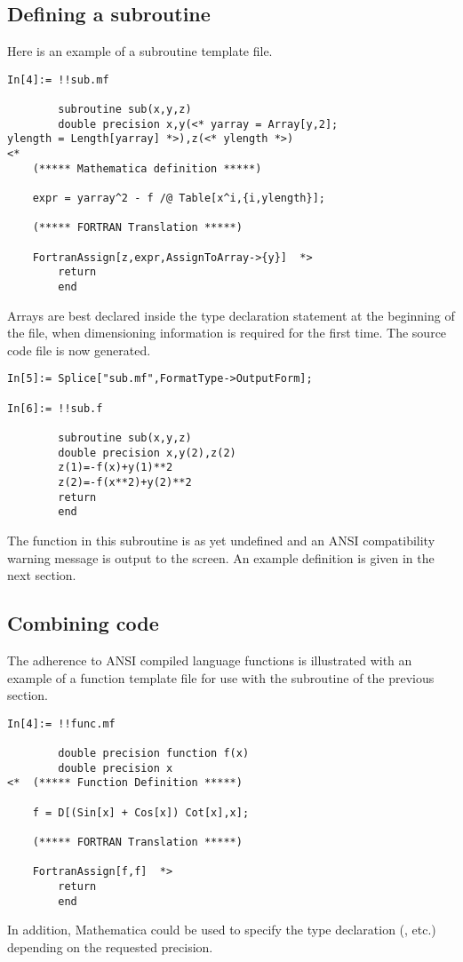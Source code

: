 \documentclass [12pt,twoside]{article}
\begin{document}
\subsection{Defining a subroutine}
Here is an example of a subroutine template file.
\begin{verbatim}
In[4]:= !!sub.mf

        subroutine sub(x,y,z)
        double precision x,y(<* yarray = Array[y,2];
ylength = Length[yarray] *>),z(<* ylength *>)
<*
    (***** Mathematica definition *****)

    expr = yarray^2 - f /@ Table[x^i,{i,ylength}];

    (***** FORTRAN Translation *****)

    FortranAssign[z,expr,AssignToArray->{y}]  *>
        return
        end
\end{verbatim}
Arrays are best declared inside the type declaration statement at the beginning of the file,
when dimensioning information is required for the first time.
The source code file is now generated.

\begin{verbatim}
In[5]:= Splice["sub.mf",FormatType->OutputForm];

In[6]:= !!sub.f

        subroutine sub(x,y,z)
        double precision x,y(2),z(2)
        z(1)=-f(x)+y(1)**2
        z(2)=-f(x**2)+y(2)**2
        return
        end
\end{verbatim}
The function  in this subroutine is as yet undefined and an ANSI
compatibility warning message is output to the screen. An example definition is
given in the next section.

\pagebreak[2]

\subsection{Combining code}
The adherence to ANSI compiled language functions is illustrated with an example
of a function template file for use with the subroutine of the previous section.

\begin{verbatim}
In[4]:= !!func.mf

        double precision function f(x)
        double precision x
<*  (***** Function Definition *****)

    f = D[(Sin[x] + Cos[x]) Cot[x],x];

    (***** FORTRAN Translation *****)

    FortranAssign[f,f]  *>
        return
        end
\end{verbatim}
In addition, Mathematica could be used to specify the type declaration
(,  etc.) depending on the requested precision.
\end{document}
